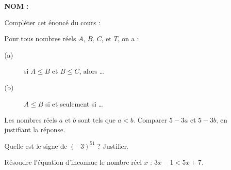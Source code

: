 \documentclass[a4paper,11pt,DIV15,BCOR0mm]{scrartcl}
\begin{document}
\newcommand{\vv}[1]{\vect{#1}}
\noindent\textbf{NOM : }

\begin{exercice}[Cours]
Compléter cet énoncé du cours :

\begin{axiome} Pour tous nombres réels $A$, $B$, $C$, et $T$, on a :
 \begin{description}
  \item [(a)] si $A\leq B$ et $B\leq C$, alors \dots 
  \item [(b)]\label{item:translation} $A\leq B$ si et seulement si \dots
 \end{description}
\end{axiome}

\end{exercice}

\begin{exercice}
Les nombres réels $a$ et $b$ sont tels que $a<b$.
Comparer $5-3a$ et $5-3b$, en justifiant la réponse. 
\end{exercice}
\vfill
\begin{exercice}
Quelle  est le signe de $(-3)^{51}$ ? Justifier.
\end{exercice}
\vfill

\begin{exercice}
Résoudre  l'équation d'inconnue le nombre réel $x$ : $3x-1<5x+7$.
\end{exercice}
\vfill
\vfill
\end{document}
